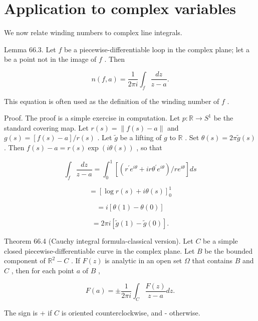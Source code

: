\section*{Application to complex variables}

We now relate winding numbers to complex line integrals.

Lemma 66.3. Let \(f\) be a piecewise-differentiable loop in the complex plane; let a be a point not in the image of \(f\) . Then

\[
n\left( {f,a}\right)  = \frac{1}{2\pi i}{\int }_{f}\frac{dz}{z - a}.
\]

This equation is often used as the definition of the winding number of \(f\) .

Proof. The proof is a simple exercise in computation. Let \(p : \mathbb{R} \rightarrow  {S}^{1}\) be the standard covering map. Let \(r\left( s\right)  = \parallel f\left( s\right)  - a\parallel\) and \(g\left( s\right)  = \left\lbrack  {f\left( s\right)  - a}\right\rbrack  /r\left( s\right)\) . Let \(\widetilde{g}\) be a lifting of \(g\) to \(\mathbb{R}\) . Set \(\theta \left( s\right)  = {2\pi }\widetilde{g}\left( s\right)\) . Then \(f\left( s\right)  - a = r\left( s\right) \exp \left( {{i\theta }\left( s\right) }\right)\) , so that

\[
{\int }_{f}\frac{dz}{z - a} = {\int }_{0}^{1}\left\lbrack  {\left( {{r}^{\prime }{e}^{i\theta } + {ir}{\theta }^{\prime }{e}^{i\theta }}\right) /r{e}^{i\theta }}\right\rbrack  {ds}
\]

\[
= {\left\lbrack  \log r\left( s\right)  + i\theta \left( s\right) \right\rbrack  }_{0}^{1}
\]

\[
= i\left\lbrack  {\theta \left( 1\right)  - \theta \left( 0\right) }\right\rbrack
\]

\[
= {2\pi i}\left\lbrack  {\widetilde{g}\left( 1\right)  - \widetilde{g}\left( 0\right) }\right\rbrack  .
\]

Theorem 66.4 (Cauchy integral formula-classical version). Let \(C\) be a simple closed piecewise-differentiable curve in the complex plane. Let \(B\) be the bounded component of \({\mathbb{R}}^{2} - C\) . If \(F\left( z\right)\) is analytic in an open set \(\Omega\) that contains \(B\) and \(C\) , then for each point \(a\) of \(B\) ,

\[
F\left( a\right)  =  \pm  \frac{1}{2\pi i}{\int }_{C}\frac{F\left( z\right) }{z - a}{dz}.
\]

The sign is + if \(C\) is oriented counterclockwise, and - otherwise.

